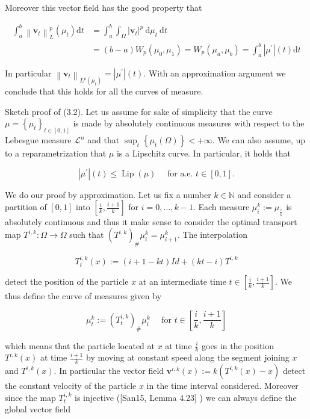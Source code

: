 \documentclass[10pt]{article}
\begin{document}
Moreover this vector field has the good property that

\[
\begin{aligned}
\int_{a}^{b}\left\|\mathbf{v}_{t}\right\|_{L}^{p}\left(\mu_{t}\right) \mathrm{d} t & =\int_{a}^{b} \int_{\Omega}\left|\mathbf{v}_{t}\right|^{p} \mathrm{~d} \mu_{t} \mathrm{~d} t \\
& =(b-a) W_{p}\left(\mu_{0}, \mu_{1}\right)=W_{p}\left(\mu_{a}, \mu_{b}\right)=\int_{a}^{b}\left|\mu^{\prime}\right|(t) \mathrm{d} t
\end{aligned}
\]

In particular \(\left\|\mathbf{v}_{t}\right\|_{L^{p}\left(\mu_{t}\right)}=\left|\mu^{\prime}\right|(t)\). With an approximation argument we conclude that this holds for all the curves of measure.

Sketch proof of (3.2). Let us assume for sake of simplicity that the curve \(\mu=\left\{\mu_{t}\right\}_{t \in[0,1]}\) is made by absolutely continuous measures with respect to the Lebesgue measure \(\mathcal{L}^{n}\) and that \(\sup _{t}\left\{\mu_{t}(\Omega)\right\}<+\infty\). We can also assume, up to a reparametrization that \(\mu\) is a Lipschitz curve. In particular, it holds that

\[
\left|\mu^{\prime}\right|(t) \leq \operatorname{Lip}(\mu) \quad \text { for a.e. } t \in[0,1] .
\]

We do our proof by approximation. Let us fix a number \(k \in \mathbb{N}\) and consider a partition of \([0,1]\) into \(\left[\frac{i}{k}, \frac{i+1}{k}\right]\) for \(i=0, \ldots, k-1\). Each measure \(\mu_{i}^{k}:=\mu_{\frac{i}{k}}\) is absolutely continuous and thus it make sense to consider the optimal transport map \(T^{i, k}: \Omega \rightarrow \Omega\) such that \(\left(T^{i, k}\right)_{\#} \mu_{i}^{k}=\mu_{i+1}^{k}\). The interpolation

\[
T_{t}^{i, k}(x):=(i+1-k t) I d+(k t-i) T^{i, k}
\]

detect the position of the particle \(x\) at an intermediate time \(t \in\left[\frac{i}{k}, \frac{i+1}{k}\right]\). We thus define the curve of measures given by

\[
\mu_{t}^{k}:=\left(T_{t}^{i, k}\right)_{\#} \mu_{i}^{k} \quad \text { for } t \in\left[\frac{i}{k}, \frac{i+1}{k}\right]
\]

which means that the particle located at \(x\) at time \(\frac{i}{k}\) goes in the position \(T^{i, k}(x)\) at time \(\frac{i+1}{k}\) by moving at constant speed along the segment joining \(x\) and \(T^{i, k}(x)\). In particular the vector field \(\mathbf{v}^{i, k}(x):=k\left(T^{i, k}(x)-x\right)\) detect the constant velocity of the particle \(x\) in the time interval considered. Moreover since the map \(T_{t}^{i, k}\) is injective ([San15, Lemma 4.23] ) we can always define the global vector field
\end{document}
